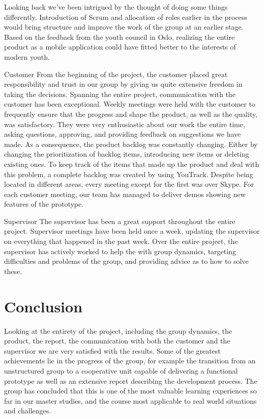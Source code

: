 Looking back we’ve been intrigued by the thought of doing some things differently. Introduction of Scrum and allocation of roles earlier in the process would bring structure and improve the work of the group at an earlier stage. Based on the feedback from the youth council in Oslo, realizing the entire product as a mobile application could have fitted better to the interests of modern youth.

Customer
From the beginning of the project, the customer placed great responsibility and trust in our group by giving us quite extensive freedom in taking the decisions. Spanning the entire project, communication with the customer has been exceptional. Weekly meetings were held with the customer to frequently ensure that the progress and shape the product, as well as the quality, was satisfactory. They were very enthusiastic about our work the entire time, asking questions, approving, and providing feedback on suggestions we have made. As a consequence, the product backlog was constantly changing. Either by changing the prioritization of backlog items, introducing new items or deleting existing ones. To keep track of the items that made up the product and deal with this problem, a complete backlog was created by using YouTrack. Despite being located in different areas, every meeting except for the first was over Skype. For each customer meeting, our team has managed to deliver demos showing new features of the prototype. 

Supervisor 
The supervisor has been a great support throughout the entire project. Supervisor meetings have been held once a week, updating the supervisor on everything that happened in the past week. Over the entire project, the supervisor has actively worked to help the with group dynamics, targeting difficulties and problems of the group, and providing advice as to how to solve these. 

\newpage
\chapter{Conclusion} 
Looking at the entirety of the project, including the group dynamics, the product, the report, the communication with both the customer and the supervisor we are very satisfied with the results. Some of the greatest achievements lie in the progress of the group, for example the transition from an unstructured group to a cooperative unit capable of delivering a functional prototype as well as an extensive report describing the development process. The group has concluded that this is one of the most valuable learning experiences so far in our master studies, and the course most applicable to real world situations and challenges.

